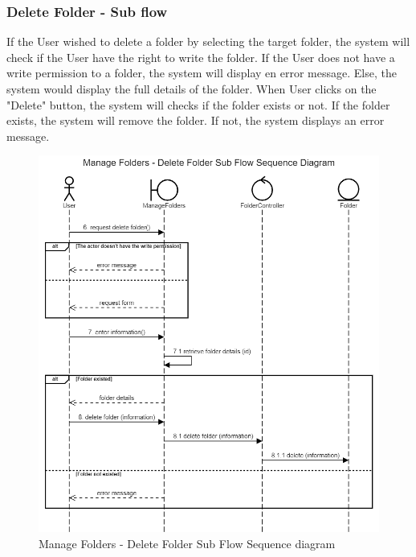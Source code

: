 \subsubsection{Delete Folder - Sub flow}
If the User wished to delete a folder by selecting the target folder, the system will check if the User have the right to write the folder. If the User does not have a write permission to a folder, the system will display en error message. Else, the system would display the full details of the folder. When User clicks on the "Delete" button, the system will checks if the folder exists or not. If the folder exists, the system will remove the folder. If not, the system displays an error message.
\begin{figure}[H]
    \centering
    \includegraphics[width=1.0\textwidth]{images/Manage Folders - Delete Folder Sub Flow Sequence Diagram.png}
    \caption{Manage Folders - Delete Folder Sub Flow Sequence diagram}
    \label{fig:SeqFoldersDelete}
\end{figure}
